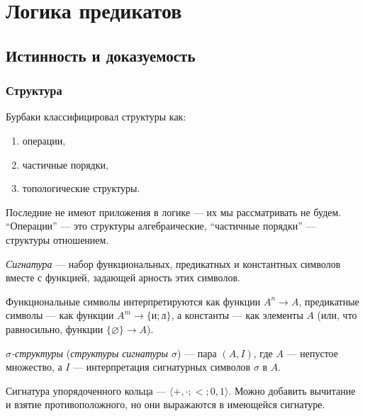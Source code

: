 \documentclass[a4paper,11pt]{article}
\begin{document}
\maketitle

\tableofcontents

\section{Логика предикатов}

\subsection{Истинность и доказуемость}

\subsubsection{Структура}

Бурбаки классифицировал структуры как:
\begin{enumerate}
	\item операции,
	\item частичные порядки,
	\item топологические структуры.
\end{enumerate}

Последние не имеют приложения в логике --- их мы рассматривать не будем. “Операции” --- это структуры алгебраические, “частичные порядки” --- структуры отношением.

\begin{definition}
	\emph{Сигнатура} --- набор функциональных, предикатных и константных символов вместе с функцией, задающей арность этих символов.

	Функциональные символы интерпретируются как функции $A^n \to A$, предикатные символы --- как функции $A^m \to \{\text{и}; \text{л}\}$, а константы --- как элементы $A$ (или, что равносильно, функции $\{\varnothing\} \to A$).

	\emph{$\sigma$-структуры} (\emph{структуры сигнатуры $\sigma$}) --- пара $(A, I)$, где $A$ --- непустое множество, а $I$ --- интерпретация сигнатурных символов $\sigma$ в $A$.
\end{definition}

\begin{exmpl}
	Сигнатура упорядоченного кольца --- $\langle {+}, {\cdot}; {<}; 0, 1 \rangle$. Можно добавить вычитание и взятие противоположного, но они выражаются в имеющейся сигнатуре.
\end{exmpl}
\end{document}
